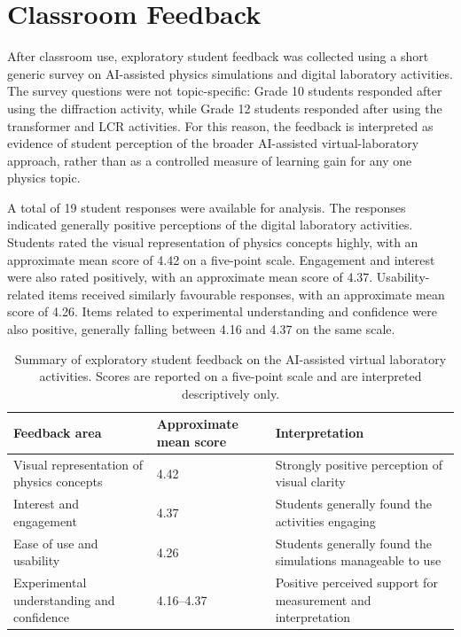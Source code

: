 \documentclass{iopjournal}
\begin{document}
\section{Classroom Feedback}

After classroom use, exploratory student feedback was collected using a short generic survey on AI-assisted physics simulations and digital laboratory activities. The survey questions were not topic-specific: Grade 10 students responded after using the diffraction activity, while Grade 12 students responded after using the transformer and LCR activities. For this reason, the feedback is interpreted as evidence of student perception of the broader AI-assisted virtual-laboratory approach, rather than as a controlled measure of learning gain for any one physics topic.

A total of 19 student responses were available for analysis. The responses indicated generally positive perceptions of the digital laboratory activities. Students rated the visual representation of physics concepts highly, with an approximate mean score of 4.42 on a five-point scale. Engagement and interest were also rated positively, with an approximate mean score of 4.37. Usability-related items received similarly favourable responses, with an approximate mean score of 4.26. Items related to experimental understanding and confidence were also positive, generally falling between 4.16 and 4.37 on the same scale.

\begin{table}[htbp]
\caption{Summary of exploratory student feedback on the AI-assisted virtual laboratory activities. Scores are reported on a five-point scale and are interpreted descriptively only.}
\label{tab:student_feedback}
\centering
\begin{tabular}{p{5.5cm} p{3.0cm} p{4.5cm}}
\hline
\textbf{Feedback area} & \textbf{Approximate mean score} & \textbf{Interpretation} \\
\hline
Visual representation of physics concepts & 4.42 & Strongly positive perception of visual clarity \\
Interest and engagement & 4.37 & Students generally found the activities engaging \\
Ease of use and usability & 4.26 & Students generally found the simulations manageable to use \\
Experimental understanding and confidence & 4.16--4.37 & Positive perceived support for measurement and interpretation \\
\hline
\end{tabular}
\end{table}
\end{document}
